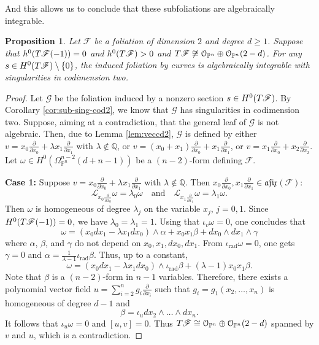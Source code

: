 \documentclass[twoside]{amsart}
\numberwithin{equation}{section}
\newcommand{\opn}{{\mathcal O}_{\mathbb{P}^{n}}}
\newcommand{\omn}[1]{\Omega_{\mathbb{P}^{n}}^{#1}}
\DeclareMathOperator{\rad}{rad}
\newcommand{\sF}{\mathscr{F}}
\newcommand{\sG}{\mathscr{G}}
\newcommand{\tF}{{\rm T}\sF}
\newcommand{\afix}{\mathfrak{afix}}
\newcommand{\lieder}{\mathcal{L}}
\newcommand{\del}[1]{\frac{\partial}{\partial #1}}
\newtheorem{proposition}[theorem]{Proposition}
\theoremstyle{definition}
\begin{document}
And this allows us to conclude that these subfoliations are algebraically integrable. 

\begin{proposition}\label{prop:sub-deg2-alg}
Let $\sF$ be a foliation of dimension $2$ and degree $d\geq 1$. Suppose that $h^0(\tF(-1)) = 0$ and $h^0(\tF)>0$ and $\tF  \not\cong \opn\oplus \opn(2-d)$. For any $ s \in H^0( \tF)\setminus \{0 \}$, the induced foliation by curves is algebraically integrable with singularities in codimension two.
\end{proposition}



\begin{proof}
Let $\sG$ be the foliation induced by a nonzero section $s \in H^0( \tF)$. By Corollary \ref{cor:sub-sing-cod2}, we know that $\sG$ has singularities in codimension two. Suppose, aiming at a contradiction, that the general leaf of $\sG$ is not algebraic. Then, due to Lemma \ref{lem:veccd2}, $\sG$ is defined by either $v = x_0\del{ x_0} + \lambda x_1\del{ x_1}$ with $\lambda \not \in \mathbb{Q}$, or $v = (x_0+ x_1)\del{ x_0} + x_1\del{ x_1}$, or { $v = x_1\del{ x_0} + x_2\del{ x_2}$}. Let $\omega \in H^0(\omn{n-2}(d+n-1))$ be a $(n-2)$-form defining $\sF$. 

\medskip\noindent
\textbf{Case 1:} Suppose $v = x_0\del{ x_0} + \lambda x_1\del{ x_1}$ with $\lambda \not \in \mathbb{Q}$. Then $x_0 \del{ x_0}, x_1 \del{ x_1} \in \afix(\sF)$:
\[
\lieder_{x_0 \del{ x_0}} \omega = \lambda_0 \omega \quad  \text{and} \quad \lieder_{x_1 \del{ x_1}} \omega = \lambda_1 \omega.
\]
Then $\omega$ is homogeneous of degree $\lambda_j$ on the variable $x_j$, $j =0,1$. Since $H^0(\tF(-1)) = 0$, we have $\lambda_0= \lambda_1 = 1$. Using that $\iota_v \omega =0$, one concludes that 
\[
\omega = (x_0dx_1 - \lambda x_1dx_0)\wedge \alpha + x_0x_1\beta + dx_0\wedge dx_1\wedge \gamma
\]
where $\alpha$, $\beta$, and $\gamma$ do not depend on $x_0,x_1,dx_0,dx_1$. From $\iota_{\rad} \omega = 0$, one gets $\gamma = 0$ and $\alpha = \frac{1}{\lambda -1} \iota_{\rad} \beta$. Thus, up to a constant,
\[
\omega = (x_0dx_1 - \lambda x_1dx_0)\wedge \iota_{\rad}\beta + (\lambda-1)x_0x_1\beta.
\]
Note that $\beta$ is a $(n-2)$-form in $n-1$ variables. Therefore, there exists a polynomial vector field $u = \sum_{i=2}^n g_i \frac{\partial }{\partial x_i}$ such that $g_i = g_1(x_2, \dots,x_n)$ is homogeneous of degree $d-1$ and 
\[
\beta = \iota_u dx_2 \wedge \dots \wedge dx_n.
\]
It follows that $\iota_u \omega = 0$ and $[u,v] =0$. Thus $\tF \cong \opn \oplus \opn(2-d)$ spanned by $v$ and $u$, which is a contradiction. 


\end{proof}
\end{document}
